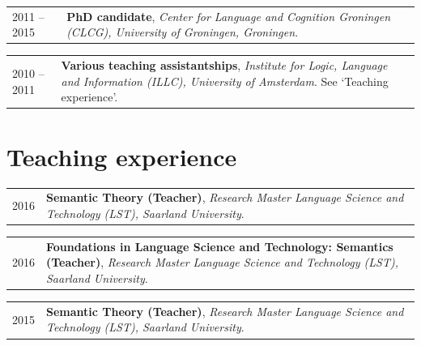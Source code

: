 \documentclass[a4paper,10pt]{article}
\def\leftcolwidth{.12\textwidth}
\def\tablevspace{10pt}
\begin{document}
\noindent
\begin{tabularx}{\textwidth}{ p{\leftcolwidth} X }
  2011 -- 2015 %
  & \textbf{PhD candidate}, \textit{Center for Language and Cognition
      Groningen (CLCG), University of Groningen, Groningen}.\\
\end{tabularx}

\vspace{\tablevspace}

\noindent
\begin{tabularx}{\textwidth}{ p{\leftcolwidth} X }
  2010 -- 2011
  & \textbf{Various teaching assistantships}, \textit{Institute for Logic,
      Language and Information (ILLC), University of Amsterdam}. See
      `Teaching experience'.\\
\end{tabularx}


\section*{Teaching experience}

\noindent
\begin{tabularx}{\textwidth}{ p{\leftcolwidth} X }
  2016
  & \textbf{Semantic Theory (Teacher)}, \textit{Research Master Language
  Science and Technology (LST), Saarland University}.\\
\end{tabularx}

\vspace{\tablevspace}

\noindent
\begin{tabularx}{\textwidth}{ p{\leftcolwidth} X }
  2016
  & \textbf{Foundations in Language Science and Technology: Semantics (Teacher)},
  \textit{Research Master Language
  Science and Technology (LST), Saarland University}.\\
\end{tabularx}

\vspace{\tablevspace}

\noindent
\begin{tabularx}{\textwidth}{ p{\leftcolwidth} X }
  2015
  & \textbf{Semantic Theory (Teacher)}, \textit{Research Master Language
  Science and Technology (LST), Saarland University}.\\
\end{tabularx}
\end{document}
